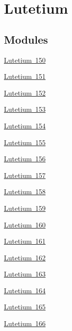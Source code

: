 \hypertarget{group___isotope_const-_lutetium}{}\section{Lutetium}
\label{group___isotope_const-_lutetium}
\subsection*{Modules}
\begin{DoxyCompactItemize}
\item 
\mbox{\hyperlink{group___isotope_const-_lutetium-_lu150}{Lutetium 150}}
\item 
\mbox{\hyperlink{group___isotope_const-_lutetium-_lu151}{Lutetium 151}}
\item 
\mbox{\hyperlink{group___isotope_const-_lutetium-_lu152}{Lutetium 152}}
\item 
\mbox{\hyperlink{group___isotope_const-_lutetium-_lu153}{Lutetium 153}}
\item 
\mbox{\hyperlink{group___isotope_const-_lutetium-_lu154}{Lutetium 154}}
\item 
\mbox{\hyperlink{group___isotope_const-_lutetium-_lu155}{Lutetium 155}}
\item 
\mbox{\hyperlink{group___isotope_const-_lutetium-_lu156}{Lutetium 156}}
\item 
\mbox{\hyperlink{group___isotope_const-_lutetium-_lu157}{Lutetium 157}}
\item 
\mbox{\hyperlink{group___isotope_const-_lutetium-_lu158}{Lutetium 158}}
\item 
\mbox{\hyperlink{group___isotope_const-_lutetium-_lu159}{Lutetium 159}}
\item 
\mbox{\hyperlink{group___isotope_const-_lutetium-_lu160}{Lutetium 160}}
\item 
\mbox{\hyperlink{group___isotope_const-_lutetium-_lu161}{Lutetium 161}}
\item 
\mbox{\hyperlink{group___isotope_const-_lutetium-_lu162}{Lutetium 162}}
\item 
\mbox{\hyperlink{group___isotope_const-_lutetium-_lu163}{Lutetium 163}}
\item 
\mbox{\hyperlink{group___isotope_const-_lutetium-_lu164}{Lutetium 164}}
\item 
\mbox{\hyperlink{group___isotope_const-_lutetium-_lu165}{Lutetium 165}}
\item 
\mbox{\hyperlink{group___isotope_const-_lutetium-_lu166}{Lutetium 166}}
\item 

\end{DoxyCompactItemize}
